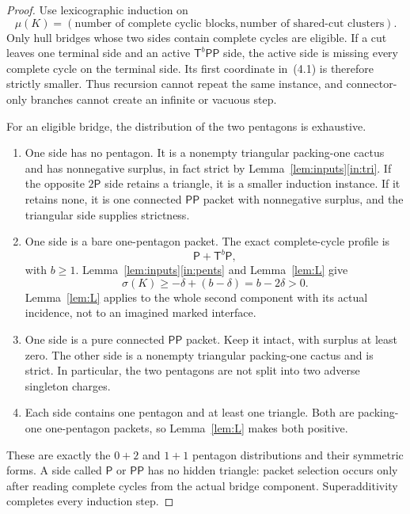 \documentclass[11pt]{article}
\theoremstyle{remark}
\newcommand{\sig}{\sigma}
\newcommand{\T}{\mathsf T}
\newcommand{\Pp}{\mathsf P}
\begin{document}
\begin{proof}
Use lexicographic induction on
\[
 \mu(K)=(\text{number of complete cyclic blocks},
          \text{number of shared-cut clusters}).          \tag{4.1}
\]
Only hull bridges whose two sides contain complete cycles are eligible.  If a
cut leaves one terminal side and an active $\T^b\Pp\Pp$ side, the active side
is missing every complete cycle on the terminal side.  Its first coordinate
in~(4.1) is therefore strictly smaller.  Thus recursion cannot repeat the same
instance, and connector-only branches cannot create an infinite or vacuous
step.

For an eligible bridge, the distribution of the two pentagons is exhaustive.
\begin{enumerate}
\item One side has no pentagon.  It is a nonempty triangular packing-one
cactus and has nonnegative surplus, in fact strict by
Lemma~\ref{lem:inputs}\ref{in:tri}.  If the opposite $2\Pp$ side retains a
triangle, it is a smaller induction instance.  If it retains none, it is one
connected $\Pp\Pp$ packet with nonnegative surplus, and the triangular side
supplies strictness.

\item One side is a bare one-pentagon packet.  The exact complete-cycle
profile is
\[
 \Pp+\T^b\Pp,
\]
with $b\geq1$.  Lemma~\ref{lem:inputs}\ref{in:pents} and Lemma~\ref{lem:L}
give
\[
 \sig(K)\geq-\delta+(b-\delta)=b-2\delta>0.              \tag{4.2}
\]
Lemma~\ref{lem:L} applies to the whole second component with its actual
incidence, not to an imagined marked interface.

\item One side is a pure connected $\Pp\Pp$ packet.  Keep it intact, with
surplus at least zero.  The other side is a nonempty triangular packing-one
cactus and is strict.  In particular, the two pentagons are not split into two
adverse singleton charges.

\item Each side contains one pentagon and at least one triangle.  Both are
packing-one one-pentagon packets, so Lemma~\ref{lem:L} makes both positive.
\end{enumerate}
These are exactly the $0+2$ and $1+1$ pentagon distributions and their
symmetric forms.  A side called $\Pp$ or $\Pp\Pp$ has no hidden triangle:
packet selection occurs only after reading complete cycles from the actual
bridge component.  Superadditivity completes every induction step.
\end{proof}
\end{document}
